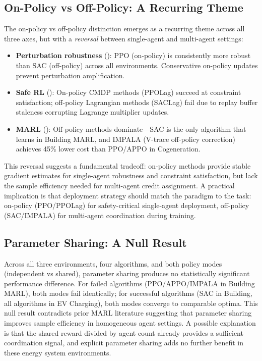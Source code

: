 \subsection{On-Policy vs Off-Policy: A Recurring Theme}

The on-policy vs off-policy distinction emerges as a recurring theme across all three axes, but with a \emph{reversal} between single-agent and multi-agent settings:

\begin{itemize}
    \item \textbf{Perturbation robustness} (): PPO (on-policy) is consistently more robust than SAC (off-policy) across all environments. Conservative on-policy updates prevent perturbation amplification.
    \item \textbf{Safe RL} (): On-policy CMDP methods (PPOLag) succeed at constraint satisfaction; off-policy Lagrangian methods (SACLag) fail due to replay buffer staleness corrupting Lagrange multiplier updates.
    \item \textbf{MARL} (): Off-policy methods dominate---SAC is the only algorithm that learns in Building MARL, and IMPALA (V-trace off-policy correction) achieves 45\% lower cost than PPO/APPO in Cogeneration.
\end{itemize}

This reversal suggests a fundamental tradeoff: on-policy methods provide stable gradient estimates for single-agent robustness and constraint satisfaction, but lack the sample efficiency needed for multi-agent credit assignment. A practical implication is that deployment strategy should match the paradigm to the task: on-policy (PPO/PPOLag) for safety-critical single-agent deployment, off-policy (SAC/IMPALA) for multi-agent coordination during training.

\subsection{Parameter Sharing: A Null Result}

Across all three environments, four algorithms, and both policy modes (independent vs shared), parameter sharing produces no statistically significant performance difference. For failed algorithms (PPO/APPO/IMPALA in Building MARL), both modes fail identically; for successful algorithms (SAC in Building, all algorithms in EV Charging), both modes converge to comparable optima. This null result contradicts prior MARL literature suggesting that parameter sharing improves sample efficiency in homogeneous agent settings. A possible explanation is that the shared reward divided by agent count already provides a sufficient coordination signal, and explicit parameter sharing adds no further benefit in these energy system environments.

